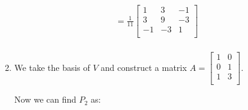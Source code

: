 \documentclass[12pt,letterpaper]{article}
\begin{document}
\begin{enumerate}
\begin{enumerate}
\begin{align*}
            &= \frac{1}{11}\begin{bmatrix}1 & 3 & -1 \\ 3 & 9 & -3 \\ -1 & -3 & 1 \\\end{bmatrix} \\
          \end{align*}
        \item
          We take the basis of $V$ and construct a matrix $A = \begin{bmatrix}1 & 0 \\ 0 & 1 \\ 1 & 3 \\\end{bmatrix}$.

          Now we can find $P_2$ as:


\end{enumerate}
\end{enumerate}
\end{document}
